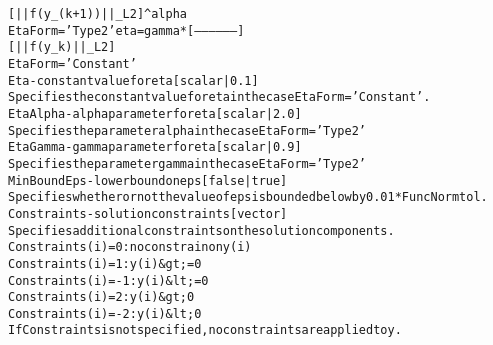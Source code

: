 \begin{alltt}
                                  [ ||f(y_(k+1))||_L2 ]^alpha
   EtaForm='Type2'  eta = gamma * [ ----------------- ]
                                  [  ||f(y_k)||_L2    ]
   EtaForm='Constant'
Eta - constant value for eta [ scalar | {0.1} ]
   Specifies the constant value for eta in the case EtaForm='Constant'.
EtaAlpha - alpha parameter for eta [ scalar | {2.0} ]
   Specifies the parameter alpha in the case EtaForm='Type2'
EtaGamma - gamma parameter for eta [ scalar | {0.9} ]
   Specifies the parameter gamma in the case EtaForm='Type2'
MinBoundEps - lower bound on eps [ false | {true} ]
   Specifies whether or not the value of eps is bounded below by 0.01*FuncNormtol.
Constraints - solution constraints [ vector ]
   Specifies additional constraints on the solution components.
     Constraints(i) =  0 : no constrain on y(i)
     Constraints(i) =  1 : y(i) &gt;= 0
     Constraints(i) = -1 : y(i) &lt;= 0
     Constraints(i) =  2 : y(i) &gt; 0
     Constraints(i) = -2 : y(i) &lt; 0
   If Constraints is not specified, no constraints are applied to y.


\end{alltt}
